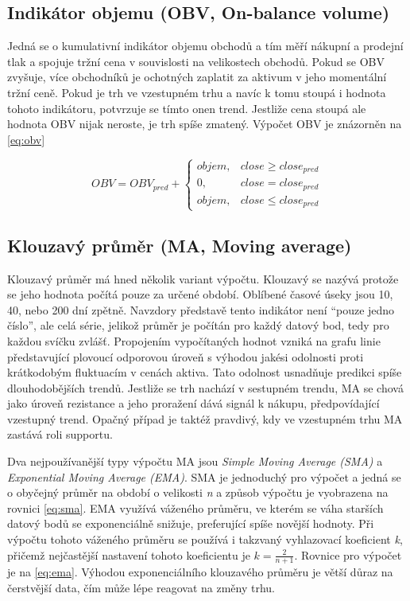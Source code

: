 \subsection{Indikátor objemu (OBV, On-balance volume)}
Jedná se o kumulativní indikátor objemu obchodů a tím měří nákupní a prodejní tlak a spojuje tržní cena v souvislosti na velikostech obchodů. Pokud se OBV zvyšuje, více obchodníků
je ochotných zaplatit za aktivum v jeho momentální tržní ceně. Pokud je trh ve vzestupném trhu a navíc k tomu stoupá i hodnota tohoto indikátoru, potvrzuje se tímto onen trend.
Jestliže cena stoupá ale hodnota OBV nijak neroste, je trh spíše zmatený. Výpočet OBV je znázorněn na \ref{eq:obv}

\begin{equation}
    OBV = OBV_{pred} +
    \begin{cases}
        objem, & close \ge close_{pred} \\
        0,     & close = close_{pred}   \\
        objem, & close \le close_{pred}
    \end{cases}
    \label{eq:obv}
\end{equation}
\subsection{Klouzavý průměr (MA, Moving average)}
Klouzavý průměr má hned několik variant výpočtu. Klouzavý se nazývá protože se jeho hodnota počítá pouze za určené období. Oblíbené časové úseky jsou 10, 40, nebo 200 dní zpětně.
Navzdory představě tento indikátor není \enquote{pouze jedno číslo}, ale celá série, jelikož průměr je počítán pro každý datový bod, tedy pro každou svíčku zvlášť. Propojením vypočítaných
hodnot vzniká na grafu linie představující plovoucí odporovou úroveň s výhodou jakési odolnosti proti krátkodobým fluktuacím v cenách aktiva. Tato odolnost usnadňuje predikci spíše dlouhodobějších trendů.
Jestliže se trh nachází v sestupném trendu, MA se chová jako úroveň rezistance a jeho proražení dává signál k nákupu, předpovídající vzestupný trend.
Opačný případ je taktéž pravdivý, kdy ve vzestupném trhu MA zastává roli supportu.

Dva nejpoužívanější typy výpočtu MA jsou \emph{Simple Moving Average (SMA)} a \emph{Exponential Moving Average (EMA)}. SMA je jednoduchý pro výpočet a jedná se o obyčejný průměr na období
o velikosti \emph{n} a způsob výpočtu je vyobrazena na rovnici \ref{eq:sma}. EMA využívá váženého průměru, ve kterém se váha starších datový bodů se exponenciálně snižuje, preferující spíše novější hodnoty.
Při výpočtu tohoto váženého průměru se používá i takzvaný vyhlazovací koeficient \emph{k}, přičemž nejčastější nastavení tohoto koeficientu je $ k = \frac{2}{n+1}$.
Rovnice pro výpočet je na \ref{eq:ema}. Výhodou exponenciálního klouzavého průměru je větší důraz na čerstvější data, čím může lépe reagovat na změny trhu.

